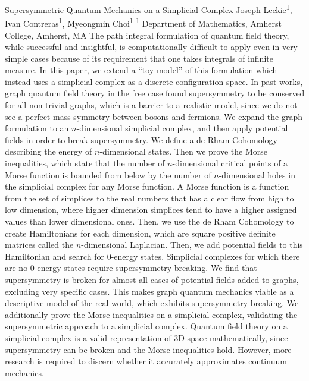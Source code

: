 \makeabstract
    {
    Supersymmetric Quantum Mechanics on a Simplicial Complex
    }
    {
    Joseph Leckie\textsuperscript{1}, Ivan Contreras\textsuperscript{1}, Myeongmin Choi\textsuperscript{1}
    }
    {
    \textsuperscript{1} Department of Mathematics, Amherst College, Amherst, MA
    }
    {
    The path integral formulation of quantum field theory, while successful and insightful, is computationally  difficult to apply even in very simple cases because of its requirement that one takes integrals of infinite measure. In this paper, we extend a ``toy model'' of this formulation which instead uses a simplicial complex as a discrete configuration space. In past works, graph quantum field theory in the free case found supersymmetry to be conserved for all non-trivial graphs, which is a barrier to a realistic model, since we do not see a perfect mass symmetry between bosons and fermions. We expand the graph formulation to an $n$-dimensional simplicial complex, and then apply potential fields in order to break supersymmetry.
    }
    {
     We define a de Rham Cohomology describing the energy of $n$-dimensional states. Then we prove the Morse inequalities, which state that the number of $n$-dimensional critical points of a Morse function is bounded from below by the number of $n$-dimensional holes in the simplicial complex for any Morse function. A Morse function is a function from the set of simplices to the real numbers that has a clear flow from high to low dimension, where higher dimension simplices tend to have a higher assigned values than lower dimensional ones. Then, we use the de Rham Cohomology to create Hamiltonians for each dimension, which are square positive definite matrices called the $n$-dimensional Laplacian. Then, we add potential fields to this Hamiltonian and search for 0-energy states. Simplicial complexes for which there are no 0-energy states require supersymmetry breaking.
    }
    {
    We find that supersymmetry is broken for almost all cases of potential fields added to graphs, excluding very specific cases. This makes graph quantum mechanics viable as a descriptive model of the real world, which exhibits supersymmetry breaking. We additionally prove the Morse inequalities on a simplicial complex, validating the supersymmetric approach to a simplicial complex.
    }
    {
    Quantum field theory on a simplicial complex is a valid representation of 3D space mathematically, since supersymmetry can be broken and the Morse inequalities hold. However, more research is required to discern whether it accurately approximates continuum mechanics. 
    }

    \newpage
    
